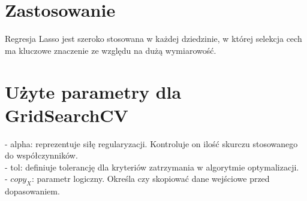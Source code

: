 {}
\section*{Zastosowanie}
\vspace{-1.0em}


\hspace{1.5cm} Regresja Lasso jest szeroko stosowana w każdej dziedzinie, w której selekcja cech ma kluczowe znaczenie ze względu na dużą wymiarowość.

{}
\section*{Użyte parametry dla GridSearchCV \cite{url_Lasso, url_grid_search}}
\vspace{-1.0em}


- alpha: reprezentuje siłę regularyzacji. Kontroluje on ilość skurczu stosowanego do współczynników.\\
- tol: definiuje tolerancję dla kryteriów zatrzymania w algorytmie optymalizacji.\\
- $copy_X$: parametr logiczny. Określa czy skopiować dane wejściowe przed dopasowaniem. \\

